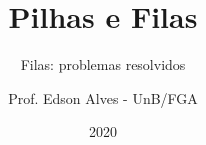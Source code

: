 \title{Pilhas e Filas}
\subtitle{Filas: problemas resolvidos}
\author{Prof. Edson Alves - UnB/FGA}
\date{2020}
